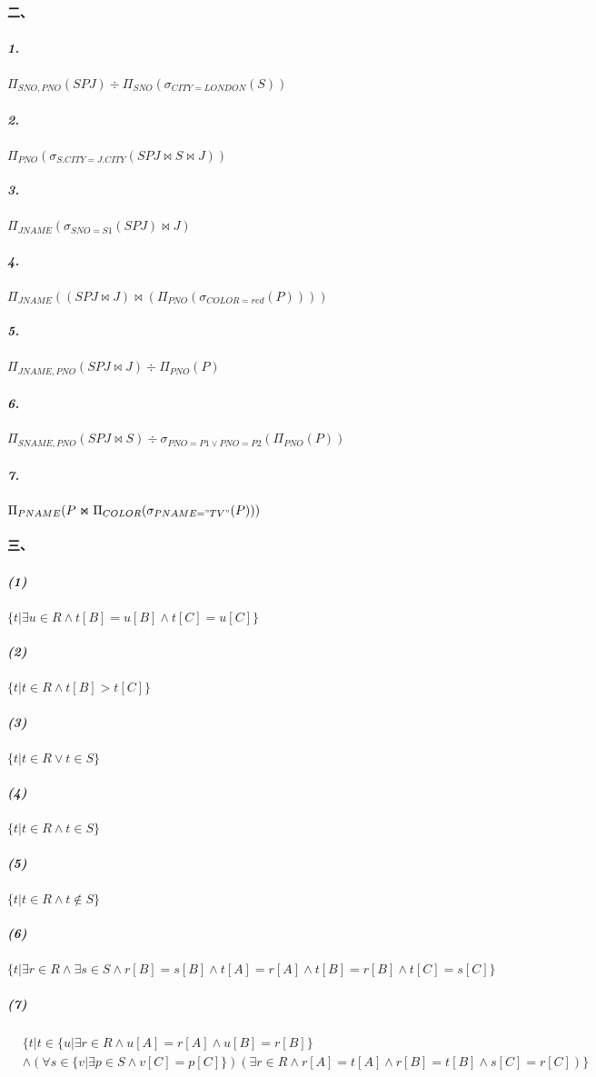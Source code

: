 \documentclass[10pt,a4paper]{article}
\begin{document}
    \paragraph{二、}
    \subparagraph{1.} $\Pi_{SNO, PNO}(SPJ) \div \Pi_{SNO}(\sigma_{CITY = LONDON}(S))$
    \subparagraph{2.} $\Pi_{PNO}(\sigma_{S.CITY = J.CITY}(SPJ \Join S \Join J))$
    \subparagraph{3.} $\Pi_{JNAME}(\sigma_{SNO = S1}(SPJ) \Join J)$
    \subparagraph{4.} $\Pi_{JNAME}((SPJ \Join J) \Join (\Pi_{PNO}(\sigma_{COLOR = red}(P))))$
    \subparagraph{5.} $\Pi_{JNAME, PNO}(SPJ \Join J) \div \Pi_{PNO}(P)$
    \subparagraph{6.} $\Pi_{SNAME, PNO}(SPJ \Join S) \div \sigma_{PNO = P1 \lor PNO = P2}(\Pi_{PNO}(P))$
    \subparagraph{7.} $\Pi_{PNAME}(P \Join \Pi_{COLOR}(\sigma_{PNAME = "TV"}(P)))$

    \paragraph{三、}
    \subparagraph{(1)} $\{t | \exists u \in R \land t[B] = u[B] \land t[C] = u[C]\}$
    \subparagraph{(2)} $\{t | t \in R \land t[B] > t[C]\}$
    \subparagraph{(3)} $\{t | t \in R \lor t \in S\}$
    \subparagraph{(4)} $\{t | t \in R \land t \in S\}$
    \subparagraph{(5)} $\{t | t \in R \land t \notin S\}$
    \subparagraph{(6)} $\{t | \exists r \in R \land \exists s \in S \land r[B] = s[B] \land t[A] = r[A] \land t[B] = r[B] \land t[C] = s[C]\}$
    \subparagraph{(7)}
    \begin{equation*}
        \begin{split}
            & \{t | t \in \{u | \exists r \in R \land u[A] = r[A] \land u[B] = r[B]\} \\
            &      \land (\forall s \in \{v | \exists p \in S \land v[C] = p[C]\})(\exists r \in R \land r[A] = t[A] \land r[B] = t[B] \land s[C] = r[C])\}
        \end{split}
    \end{equation*}
\end{document}
